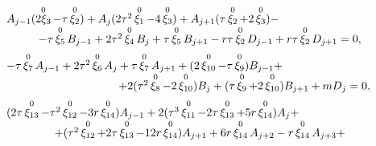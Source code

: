 \begin{equation}

\begin{array}{l}

A_{j-1}(\mathop{2\xi_3}\limits^{0}-\tau\mathop{\xi_2}\limits^{0})+

A_j(2\tau^2\mathop{\xi_1}\limits^{0}-4\mathop{\xi_3}\limits^{0})+

A_{j+1}(\tau\mathop{\xi_2}\limits^{0}+2\mathop{\xi_3}\limits^{0})- 

\\

\hspace{1cm}

-\tau\mathop{\xi_5}\limits^{0}B_{j-1}+2\tau^2\mathop{\xi_4}\limits^{0}B_j+

\tau\mathop{\xi_5}\limits^{0}B_{j+1}-r\tau\mathop{\xi_2}\limits^{0}D_{j-1}+

r\tau\mathop{\xi_2}\limits^{0}D_{j+1}=0,

\\[2mm]

-\tau\mathop{\xi_7}\limits^{0}A_{j-1}+2\tau^2\mathop{\xi_6}\limits^{0}A_j+

\tau\mathop{\xi_7}\limits^{0}A_{j+1}+(2\mathop{\xi_{10}}\limits^{0}-\tau\mathop{\xi_9}\limits^{0})B_{j-1}+ 

\\

\hspace{3.5cm}

+2(\tau^2\mathop{\xi_8}\limits^{0}-2\mathop{\xi_{10}}\limits^{0})B_j+

(\tau\mathop{\xi_9}\limits^{0}+2\mathop{\xi_{10}}\limits^{0})B_{j+1}+mD_j=0, 

\\[2mm]

(2\tau\mathop{\xi_{13}}\limits^{0}-\tau^2\mathop{\xi_{12}}\limits^{0}-3r\mathop{\xi_{14}}\limits^{0})A_{j-1}+

2(\tau^3\mathop{\xi_{11}}\limits^{0}-2\tau\mathop{\xi_{13}}\limits^{0}+5r\mathop{\xi_{14}}\limits^{0})A_j+

\\

\hspace{1.5cm}

+(\tau^2\mathop{\xi_{12}}\limits^{0}+2\tau\mathop{\xi_{13}}\limits^{0}-12r\mathop{\xi_{14}}\limits^{0})A_{j+1}+

6r\mathop{\xi_{14}}\limits^{0}A_{j+2}-r\mathop{\xi_{14}}\limits^{0}A_{j+3}+


\end{array}
\end{equation}
